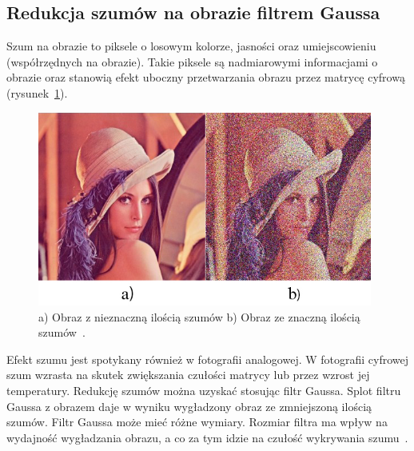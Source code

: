 \documentclass[a4paper,twoside,12pt]{book}
\begin{document}
    \subsection*{Redukcja szumów na obrazie filtrem Gaussa}\label{subsec:redukcja-szumów-na-obrazie-filtrem-gaussa}
    Szum na obrazie to piksele o losowym kolorze, jasności oraz umiejscowieniu (współrzędnych na obrazie).
    Takie piksele są nadmiarowymi informacjami o obrazie oraz stanowią efekt uboczny przetwarzania obrazu
    przez matrycę cyfrową (rysunek~\ref{fig.lenkaSzumy}).

    \begin{figure}[h!]
        \centering
        \includegraphics[width=11cm]{Obrazy/lenkaSzumy.jpg}
        \caption{a) Obraz z nieznaczną ilością szumów b) Obraz ze znaczną ilością szumów~\cite{lenkaSzumy}.}
        \label{fig.lenkaSzumy}
    \end{figure}

    Efekt szumu jest spotykany również w fotografii analogowej.
    W fotografii cyfrowej szum wzrasta na skutek zwiększania czułości matrycy lub przez wzrost jej temperatury.
    Redukcję szumów można uzyskać stosując filtr Gaussa.
    Splot filtru Gaussa z obrazem daje w wyniku wygładzony obraz ze zmniejszoną ilością szumów.
    Filtr Gaussa może mieć różne wymiary.
    Rozmiar filtra ma wpływ na wydajność wygładzania obrazu, a co za tym idzie na czułość wykrywania szumu~\cite{Canny}.
\end{document}
